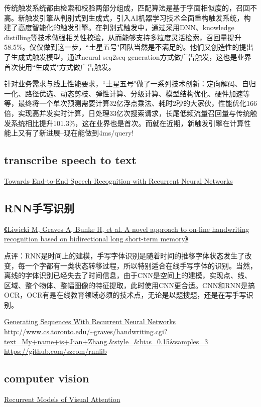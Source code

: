 传统触发系统都由检索和校验两部分组成，匹配算法是基于字面相似度的，召回不高。新触发引擎从判别式到生成式，引入AI机器学习技术全面重构触发系统，构建了高度智能化的触发引擎。在判别式触发中，通过采用DNN、knowledge distilling等技术做强相关性校验，从而能够支持多粒度灵活检索，召回量提升58.5\%。仅仅做到这一步，``土星五号"团队当然是不满足的。他们又创造性的提出了生成式触发模型，通过neural seq2seq generation方式做广告触发，这也是业界首次使用``生成式"方式做广告触发。 

针对业务需求与线上性能要求，``土星五号"做了一系列技术创新：定向解码、自归一化、路径优选、动态剪枝、弹性计算、分级计算、模型结构优化、硬件加速等等，最终将一个单次预测需要计算32亿浮点乘法、耗时2秒的大家伙，性能优化166倍，实现高并发实时计算，日处理33亿次搜索请求，长尾低频流量召回量与传统触发系统相比提升101.3\%，这在业界也是首次。而就在近期，新触发引擎在计算性能上又有了新进展--现在能做到4ms/query!


\subsection{transcribe speech to text}
\href{http://proceedings.mlr.press/v32/graves14.pdf}{Towards End-to-End Speech Recognition with Recurrent Neural Networks}

\subsection{RNN手写识别}
\href{http://www6.in.tum.de/Main/Publications/Liwicki2007a.pdf}{《Liwicki M, Graves A, Bunke H, et al. A novel approach to on-line handwriting recognition based on bidirectional long short-term memory》}

点评：RNN是时间上的建模，手写字体识别是随着时间的推移字体状态发生了改变，每一个字都有一类状态转移过程，所以特别适合在线手写字体的识别。当然，离线的字体识别已经失去了时间信息，由于CNN是空间上的建模，实现点、线、区域、整个物体、整幅图像的特征提取，此时使用CNN更合适。CNN和RNN是搞OCR，OCR有是在线教育领域必须的技术点，无论是以题搜题，还是在写手写识别。

\href{https://arxiv.org/abs/1308.0850}{Generating Sequences With Recurrent Neural Networks}
\url{http://www.cs.toronto.edu/~graves/handwriting.cgi?text=My+name+is+Jian+Zhang.\&style=\&bias=0.15\&samples=3}
\url{https://github.com/szcom/rnnlib}

\subsection{computer vision}
\href{https://arxiv.org/abs/1406.6247}{Recurrent Models of Visual Attention}


